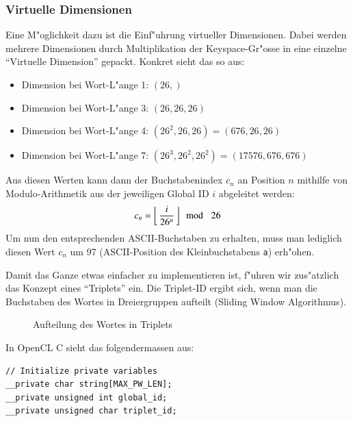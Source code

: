 \begin{refsection}

\subsubsection{Virtuelle Dimensionen}
\label{crypt:virtuelle_dimensionen}

Eine M"oglichkeit dazu ist die Einf"uhrung virtueller Dimensionen. Dabei werden
mehrere Dimensionen durch Multiplikation der Keyspace-Gr"osse in eine einzelne
``Virtuelle Dimension'' gepackt. Konkret sieht das so aus:

\begin{itemize}
	\item Dimension bei Wort-L"ange 1: $(26,)$
	\item Dimension bei Wort-L"ange 3: $(26, 26, 26)$
	\item Dimension bei Wort-L"ange 4: $(26^2, 26, 26) = (676, 26, 26)$
	\item Dimension bei Wort-L"ange 7: $(26^3, 26^2, 26^2) = (17576, 676, 676)$
\end{itemize}

\noindent Aus diesen Werten kann dann der Buchstabenindex $c_n$ an Position $n$
mithilfe von Modulo-Arithmetik aus der jeweiligen Global ID $i$ abgeleitet
werden:
\[
	c_n = \left\lfloor\,\frac{i}{26^n}\,\right\rfloor\! \mod\enskip 26
\]
Um nun den entsprechenden ASCII-Buchstaben zu erhalten, muss man lediglich
diesen Wert $c_n$ um 97 (ASCII-Position des Kleinbuchstabens \texttt{a})
erh"ohen.

Damit das Ganze etwas einfacher zu implementieren ist, f"uhren wir zus"atzlich
das Konzept eines ``Triplets'' ein. Die Triplet-ID ergibt sich, wenn man die
Buchstaben des Wortes in Dreiergruppen aufteilt (Sliding Window Algorithmus).

\begin{figure}[H]
	\centering
	
	\caption{Aufteilung des Wortes in Triplets}
	\label{img:crypto:triplets}
\end{figure}


\noindent In OpenCL C sieht das folgendermassen aus:

\begin{small}
\begin{verbatim}
// Initialize private variables
__private char string[MAX_PW_LEN];
__private unsigned int global_id;
__private unsigned char triplet_id;


\end{verbatim}
\end{small}
\end{refsection}
